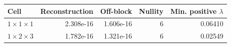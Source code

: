 \begin{tabular}{lrrrr}
\hline
Cell & Reconstruction & Off-block & Nullity & Min. positive $\lambda$\\
\hline
$1\times1\times1$ & 2.308e-16 & 1.606e-16 & 6 & 0.06410\\
$1\times2\times3$ & 1.782e-16 & 1.321e-16 & 6 & 0.02549\\
\hline
\end{tabular}
